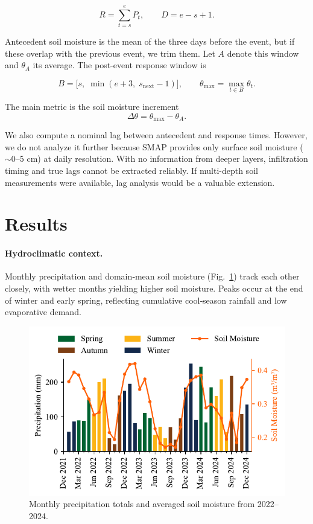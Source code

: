 \documentclass[twocolumn]{article}
\begin{document}
\[
R = \sum_{t=s}^{e} P_t, 
\qquad 
D = e - s + 1.
\]

Antecedent soil moisture is the mean of the three days before the event, but if these overlap with the previous event, we trim them. Let \(A\) denote this window and \(\theta_A\) its average. The post-event response window is  

\[
B = \big[s,\; \min(e+3,\; s_{\mathrm{next}}-1)\big],
\qquad 
\theta_{\max} = \max_{t \in B} \theta_t .
\]

The main metric is the soil moisture increment  
\[
\Delta \theta = \theta_{\max} - \theta_A .
\]

We also compute a nominal lag between antecedent and response times. However, we do not analyze it further because SMAP provides only surface soil moisture (\(\sim\)0--5 cm) at daily resolution. With no information from deeper layers, infiltration timing and true lags cannot be extracted reliably. If multi-depth soil measurements were available, lag analysis would be a valuable extension.  

\section*{Results}

\paragraph{Hydroclimatic context.}
Monthly precipitation and domain‐mean soil moisture (Fig.~\ref{fig:monthly_precip_sm}) track each other closely, with wetter months yielding higher soil moisture. Peaks occur at the end of winter and early spring, reflecting cumulative cool‐season rainfall and low evaporative demand.

\begin{figure}[!h]
  \centering
  \includegraphics[width=1\columnwidth]{monthly_precip_sm}
  \caption{Monthly precipitation totals and averaged soil moisture from 2022–2024.}
  \label{fig:monthly_precip_sm}
\end{figure}
\end{document}
